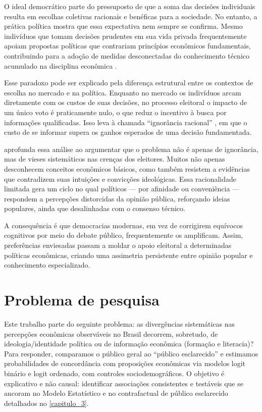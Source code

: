 O ideal democrático parte do pressuposto de que a soma das decisões individuais resulta em escolhas coletivas racionais e benéficas para a sociedade. No entanto, a prática política mostra que essa expectativa nem sempre se confirma. Mesmo indivíduos que tomam decisões prudentes em sua vida privada frequentemente apoiam propostas políticas que contrariam princípios econômicos fundamentais, contribuindo para a adoção de medidas desconectadas do conhecimento técnico acumulado na disciplina econômica \cite{downs1957economic,The_Myth_of_the_Rational_Voter}.

Esse paradoxo pode ser explicado pela diferença estrutural entre os contextos de escolha no mercado e na política. Enquanto no mercado os indivíduos arcam diretamente com os custos de suas decisões, no processo eleitoral o impacto de um único voto é praticamente nulo, o que reduz o incentivo à busca por informações qualificadas. Isso leva à chamada “ignorância racional” \cite{downs1957economic}, em que o custo de se informar supera os ganhos esperados de uma decisão fundamentada.

 aprofunda essa análise ao argumentar que o problema não é apenas de ignorância, mas de vieses sistemáticos nas crenças dos eleitores. Muitos não apenas desconhecem conceitos econômicos básicos, como também resistem a evidências que contradizem suas intuições e convicções ideológicas. Essa racionalidade limitada gera um ciclo no qual políticos — por afinidade ou conveniência — respondem a percepções distorcidas da opinião pública, reforçando ideias populares, ainda que desalinhadas com o consenso técnico.

A consequência é que democracias modernas, em vez de corrigirem equívocos cognitivos por meio do debate público, frequentemente os amplificam. Assim, preferências enviesadas passam a moldar o apoio eleitoral a determinadas políticas econômicas, criando uma assimetria persistente entre opinião popular e conhecimento especializado.

\section{Problema de pesquisa}
Este trabalho parte do seguinte problema: as divergências sistemáticas nas percepções econômicas observáveis no Brasil decorrem, sobretudo, de ideologia/identidade política ou de informação econômica (formação e literacia)? Para responder, comparamos o público geral ao “público esclarecido” e estimamos probabilidades de concordância com proposições econômicas via modelos logit binário e logit ordenado, com controles sociodemográficos. O objetivo é explicativo e não causal: identificar associações consistentes e testáveis que se ancoram no Modelo Estatístico e no contrafactual de público esclarecido detalhados no \autoref{capitulo_3}.


